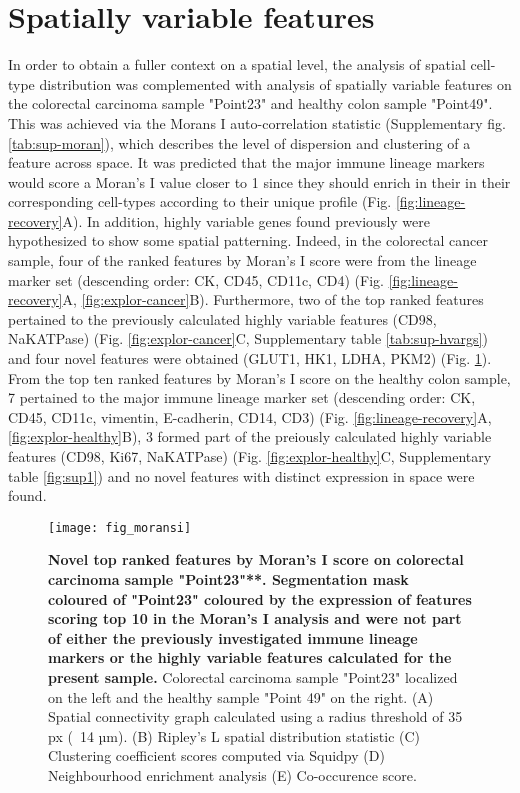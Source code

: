 \section{Spatially variable features}

In order to obtain a fuller context on a spatial level, the analysis of spatial cell-type distribution was complemented with analysis of spatially variable features on the colorectal carcinoma sample "Point23" and healthy colon sample "Point49". This was achieved via the Morans I auto-correlation statistic (Supplementary fig. \ref{tab:sup-moran}), which describes the level of dispersion and clustering of a feature across space. It was predicted that the major immune lineage markers would score a Moran's I value closer to 1 since they should enrich in their in their corresponding cell-types according to their unique profile (Fig. \ref{fig:lineage-recovery}A). In addition, highly variable genes found previously were hypothesized to show some spatial patterning. Indeed, in the colorectal cancer sample, four of the ranked features by Moran's I score were from the lineage marker set (descending order: CK, CD45, CD11c, CD4) (Fig. \ref{fig:lineage-recovery}A, \ref{fig:explor-cancer}B). Furthermore, two of the top ranked features pertained to the previously calculated highly variable features (CD98, NaKATPase) (Fig. \ref{fig:explor-cancer}C, Supplementary table \ref{tab:sup-hvargs}) and four novel features were obtained (GLUT1, HK1, LDHA, PKM2) (Fig. \ref{fig:moran}). From the top ten ranked features by Moran's I score on the healthy colon sample, 7 pertained to the major immune lineage marker set (descending order: CK, CD45, CD11c, vimentin, E-cadherin, CD14, CD3) (Fig. \ref{fig:lineage-recovery}A, \ref{fig:explor-healthy}B), 3 formed part of the preiously calculated highly variable features (CD98, Ki67, NaKATPase) (Fig. \ref{fig:explor-healthy}C, Supplementary table \ref{fig:sup1}) and no novel features with distinct expression in space were found.

\begin{figure}[h!]
    \centering
    \texttt{[image: fig\_moransi]}
    \caption{\textbf{Novel top ranked features by Moran's I score on colorectal carcinoma sample "Point23"**. Segmentation mask coloured of "Point23" coloured by the expression of features scoring top 10 in the Moran's I analysis and were not part of either the previously investigated immune lineage markers or the highly variable features calculated for the present sample.} Colorectal carcinoma sample "Point23" localized on the left and the healthy sample "Point 49" on the right. (A) Spatial connectivity graph calculated using a radius threshold of 35 px (~14 µm). (B) Ripley's L spatial distribution statistic (C) Clustering coefficient scores computed via Squidpy (D) Neighbourhood enrichment analysis (E) Co-occurence score.}
    \label{fig:moran}
\end{figure}

